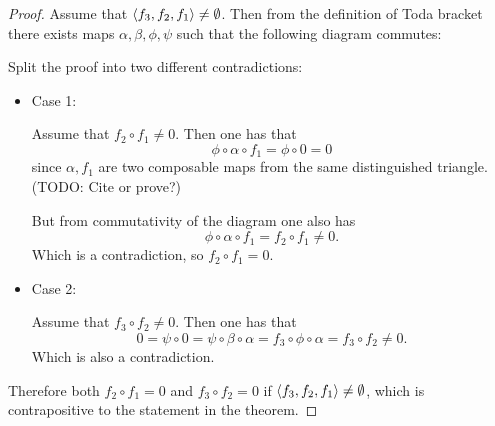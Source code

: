 \begin{proof}
	Assume that \( \langle f_3, f_2, f_1 \rangle \neq \emptyset \). Then from the definition of Toda bracket there exists maps \(\alpha, \beta, \phi, \psi \) such that the following diagram commutes:

	\begin{center}
	\end{center}

	Split the proof into two different contradictions:

	\begin{itemize}
		\item{
			Case 1:

			Assume that \( f_2 \circ f_1 \neq 0 \). Then one has that
			\[
				\phi \circ \alpha \circ f_1 = \phi \circ 0 = 0
			\]
			since \( \alpha, f_1 \) are two composable maps from the same distinguished triangle. (TODO: Cite or prove?)

			But from commutativity of the diagram one also has
			\[
				\phi \circ \alpha \circ f_1 = f_2 \circ f_1 \neq 0.
			\]
			Which is a contradiction, so \( f_2 \circ f_1 = 0 \).
		}
		\item{
			Case 2:

			Assume that \( f_3 \circ f_2 \neq 0 \). Then one has that
			\[
				0 = \psi \circ 0 = \psi \circ \beta \circ \alpha = f_3 \circ \phi \circ \alpha = f_3 \circ f_2 \neq 0.
			\]
			Which is also a contradiction.
		}
	\end{itemize}

	Therefore both \( f_2 \circ f_1 = 0 \) and \( f_3 \circ f_2 = 0 \) if \( \langle f_3, f_2, f_1 \rangle \neq \emptyset \), which is contrapositive to the statement in the theorem.

\end{proof}

